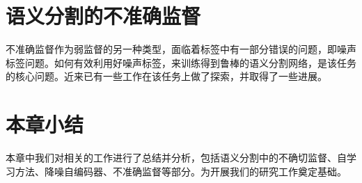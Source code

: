 \section{语义分割的不准确监督}
不准确监督作为弱监督的另一种类型，面临着标签中有一部分错误的问题，即噪声标签问题。如何有效利用好噪声标签，来训练得到鲁棒的语义分割网络，是该任务的核心问题。近来已有一些工作在该任务上做了探索，并取得了一些进展。

\citet{Zhu2019PickandLearnAQ}


\citet{Xue2020CascadedRL}




\citet{Zhang2020RobustMI}
 


\section{本章小结}
本章中我们对相关的工作进行了总结并分析，包括语义分割中的不确切监督、自学习方法、降噪自编码器、不准确监督等部分。为开展我们的研究工作奠定基础。

